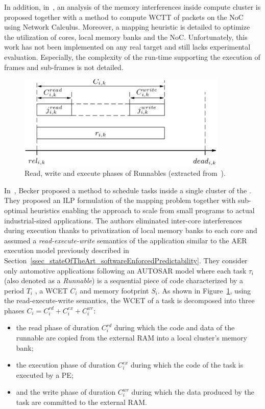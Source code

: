 \documentclass[main.tex]{subfiles}
\begin{document}
In addition, in~\cite{Giannopoulou2015}, an analysis of the memory
interferences inside compute cluster is proposed together with a method to
compute WCTT of packets on the NoC using Network Calculus. Moreover, a mapping
heuristic is detailed to optimize the utilization of cores, local memory banks
and the NoC. Unfortunately, this work has not been implemented on any real
target and still lacks experimental evaluation. Especially, the complexity of
the run-time supporting the execution of frames and sub-frames is not detailed.
\\

\begin{figure}
    \centering
    \includegraphics[width=10cm]{imgs/png/stateOfTheArt_2_RdWrExPhases.png}
    \caption{Read, write and execute phases of Runnables (extracted
    from~\cite{Becker16}).}
    \label{fig_stateOfTheArt_2_RdWeExPhases}
\end{figure}

In~\cite{Becker16}, Becker \etal proposed a method to schedule tasks inside a
single cluster of the \mppalong. They proposed an ILP formulation of the
mapping problem together with sub-optimal heuristics enabling the approach to
scale from small programs to actual industrial-sized applications. The authors
eliminated inter-core interferences during execution thanks to privatization of
local memory banks to each core and assumed a \emph{read-execute-write}
semantics of the application similar to the AER execution model previously
described in Section~\ref{ssec_stateOfTheArt_softwareEnforcedPredictability}.
They consider only automotive applications following an AUTOSAR model where
each task $\tau_i$ (also denoted as a \emph{Runnable}) is a sequential piece of
code characterized by a period $T_i$ , a WCET $C_i$ and memory footprint $S_i$.
As shown in Figure~\ref{fig_stateOfTheArt_2_RdWeExPhases}, using the
read-execute-write semantics, the WCET of a task is decomposed into three
phases $C_i = C_i^{rd} + C_i^{ex} +C_i^{wr}$:
\begin{itemize}
    \item the read phase of duration $C_i^{rd}$ during which the code and data
        of the runnable are copied from the external RAM into a local cluster's
        memory bank;
    \item the execution phase of duration $C_i^{ex}$ during which the code of
        the task is executed by a PE;
    \item and the write phase of duration $C_i^{wr}$ during which the data
        produced by the task are committed to the external RAM.
\end{itemize}
\end{document}
